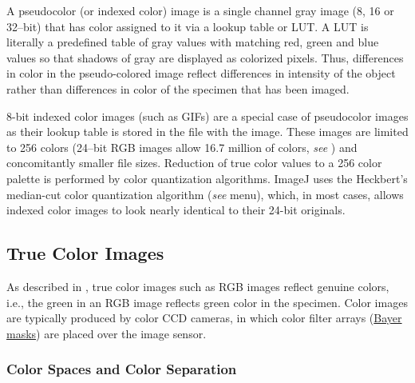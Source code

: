 A pseudocolor (or indexed color) image is a single channel gray image
(8, 16 or 32--bit) that has color assigned to it via a lookup table
or LUT. A LUT is literally
a predefined table of gray values with matching red, green and blue
values so that shadows of gray are displayed as colorized pixels.
Thus, differences in color in the pseudo-colored image reflect differences
in intensity of the object rather than differences in color of the
specimen that has been imaged.

8-bit indexed color images (such as GIFs) are a special case of pseudocolor
images as their lookup table is stored in the file with the image.
These images are limited to 256 colors (24--bit RGB images allow 16.7
million of colors, \emph{see} ) and concomitantly
smaller file sizes. Reduction of true color values to a 256 color
palette is performed by color quantization algorithms. ImageJ uses
the Heckbert's
median-cut color quantization algorithm (\emph{see} 
menu), which, in most cases, allows indexed color images to look nearly
identical to their 24-bit originals.




\subsection*{True Color Images\label{sub:True-color-images}}

As described in , true color images such
as RGB images reflect genuine colors, i.e., the green in an RGB image
reflects green color in the specimen. Color images are typically produced
by color CCD cameras, in
which color filter arrays (\href{http://en.wikipedia.org/wiki/Bayer_filter}{Bayer masks})
are placed over the image sensor.


\subsubsection*{Color Spaces and Color Separation\label{sub:Color-Spaces-and}}

